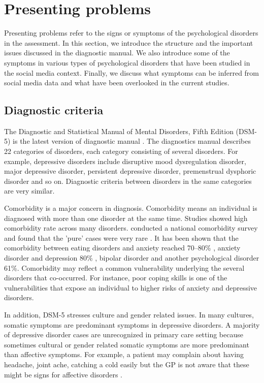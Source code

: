 \section{Presenting problems}
Presenting problems refer to the signs or symptoms of the psychological disorders in the assessment. In this section, we introduce the structure and the important issues discussed in the diagnostic manual. We also introduce some of the symptoms in various types of psychological disorders that have been studied in the social media context. Finally, we discuss what symptoms can be inferred from social media data and what have been overlooked in the current studies.

\subsection{Diagnostic criteria}
The Diagnostic and Statistical Manual of Mental Disorders, Fifth Edition (DSM-5) is the latest version of diagnostic manual \cite{american2013diagnostic}. The diagnostics manual describes 22 categories of disorders, each category consisting of several disorders. For example, depressive disorders include disruptive mood dysregulation disorder, major depressive disorder, persistent depressive disorder, premenstrual dysphoric disorder and so on. Diagnostic criteria between disorders in the same categories are very similar. 

Comorbidity is a major concern in diagnosis. Comorbidity means an individual is diagnosed with more than one disorder at the same time. Studies showed high comorbidity rate across many disorders. \citet{kessler1994lifetime} conducted a national comorbidity survey and found that the 'pure' cases were very rare \cite{kessler1994lifetime}. It has been shown that the comorbidity between eating disorders and anxiety reached 70–80\% \cite{schwalberg1992comparison}, anxiety disorder and depression 80\% \cite{judd1998comorbidity}, bipolar disorder and another psychological disorder 61\%\cite{raja2004clinical}. Comorbidity may reflect a common vulnerability underlying the several disorders that co-occurred. For instance, poor coping skills  \cite{andrews1996comorbidity} is one of the vulnerabilities that expose an individual to higher risks of anxiety and depressive disorders.   

In addition, DSM-5 stresses culture and gender related issues. In many cultures, somatic symptoms are predominant symptoms in depressive disorders. A majority of depressive disorder cases are unrecognized in primary care setting because sometimes cultural or gender related somatic symptoms are more predominant than affective symptoms. For example, a patient may complain about having headache, joint ache, catching a cold easily but the GP is not aware that these might be signs for affective disorders \cite{harvey2004cognitive}. 

